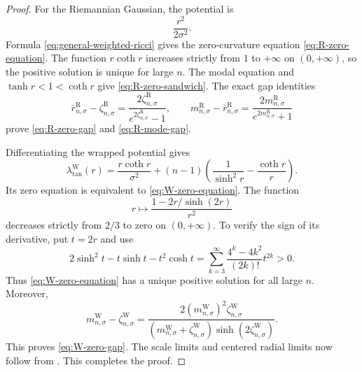 \documentclass{amsart}
\numberwithin{equation}{section}
\theoremstyle{plain}
\theoremstyle{definition}
\theoremstyle{remark}
\begin{document}
\begin{proof}
	For the Riemannian Gaussian, the potential is
	\[
		\frac{r^2}{2\sigma^2}.
	\]
	Formula \eqref{eq:general-weighted-ricci} gives the zero-curvature equation
	\eqref{eq:R-zero-equation}.  The function $r\coth r$ increases strictly
	from $1$ to $+\infty$ on $(0,+\infty)$, so the positive solution is
	unique for large $n$.  The modal equation and
	$\tanh r<1<\coth r$ give \eqref{eq:R-zero-sandwich}.  The exact gap
	identities
	\[
		\bar r^{\mathrm R}_{n,\sigma}
		-\zeta^{\mathrm R}_{n,\sigma}
		=
		\frac{2\zeta^{\mathrm R}_{n,\sigma}}
		{e^{2\zeta^{\mathrm R}_{n,\sigma}}-1},
		\qquad
		m^{\mathrm R}_{n,\sigma}
		-\bar r^{\mathrm R}_{n,\sigma}
		=
		\frac{2m^{\mathrm R}_{n,\sigma}}
		{e^{2m^{\mathrm R}_{n,\sigma}}+1}
	\]
	prove \eqref{eq:R-zero-gap} and \eqref{eq:R-mode-gap}.

	Differentiating the wrapped potential gives
	\[
		\lambda^{\mathrm W}_{\mathrm{tan}}(r)
		=
		\frac{r\coth r}{\sigma^2}
		+(n-1)\left(
		\frac1{\sinh^2r}-\frac{\coth r}{r}\right).
	\]
	Its zero equation is equivalent to \eqref{eq:W-zero-equation}.  The
	function
\[ r\longmapsto \frac{1-2r/\sinh(2r)}{r^2} \]
	decreases strictly from $2/3$ to zero on $(0,+\infty)$.  To verify the
	sign of its derivative, put $t=2r$ and use
\[ 2\sinh^2t-t\sinh t-t^2\cosh t = \sum_{k=3}^{\infty} \frac{4^k-4k^2}{(2k)!}t^{2k}>0. \]
	Thus \eqref{eq:W-zero-equation} has a unique positive solution for all
	large $n$.  Moreover,
	\[
		m^{\mathrm W}_{n,\sigma}-\zeta^{\mathrm W}_{n,\sigma}
		=
		\frac{
		2(m^{\mathrm W}_{n,\sigma})^2
		\zeta^{\mathrm W}_{n,\sigma}}
		{(m^{\mathrm W}_{n,\sigma}
		+\zeta^{\mathrm W}_{n,\sigma})
		\sinh(2\zeta^{\mathrm W}_{n,\sigma})}.
	\]
	This proves \eqref{eq:W-zero-gap}.  The scale limits and centered radial
	limits now follow from .
	This completes the proof.
\end{proof}
\end{document}
